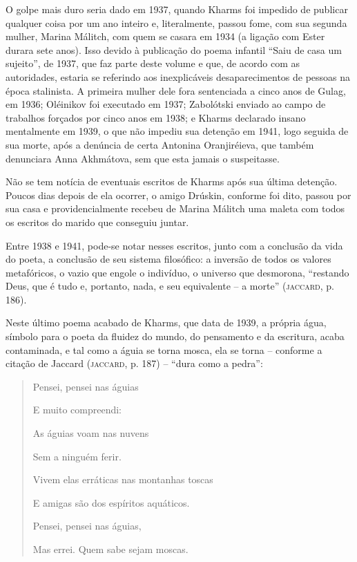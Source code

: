O golpe mais duro seria dado em 1937, quando Kharms foi impedido de
publicar qualquer coisa por um ano inteiro e, literalmente, passou fome,
com sua segunda mulher, Marina Málitch, com quem se casara em 1934 (a
ligação com Ester durara sete anos). Isso devido à publicação do poema
infantil ``Saiu de casa um sujeito'', de 1937, que faz parte deste
volume e que, de acordo com as autoridades, estaria se referindo aos
inexplicáveis desaparecimentos de pessoas na época stalinista. A
primeira mulher dele fora sentenciada a cinco anos de Gulag, em 1936;
Oléinikov foi executado em 1937; Zabolótski enviado ao campo de
trabalhos forçados por cinco anos em 1938; e Kharms declarado insano
mentalmente em 1939, o que não impediu sua detenção em 1941, logo
seguida de sua morte, após a denúncia de certa Antonina Oranjiréieva,
que também denunciara Anna Akhmátova, sem que esta jamais o suspeitasse.

Não se tem notícia de eventuais escritos de Kharms após sua última
detenção. Poucos dias depois de ela ocorrer, o amigo Drúskin, conforme
foi dito, passou por sua casa e providencialmente recebeu de Marina
Málitch uma maleta com todos os escritos do marido que conseguiu juntar.

Entre 1938 e 1941, pode-se notar nesses escritos, junto com a conclusão
da vida do poeta, a conclusão de seu sistema filosófico: a inversão de
todos os valores metafóricos, o vazio que engole o indivíduo, o universo
que desmorona, ``restando Deus, que é tudo e, portanto, nada, e seu
equivalente -- a morte'' (\textsc{jaccard}, p. 186).

Neste último poema acabado de Kharms, que data de 1939, a própria água,
símbolo para o poeta da fluidez do mundo, do pensamento e da escritura,
acaba contaminada, e tal como a águia se torna mosca, ela se torna --
conforme a citação de Jaccard (\textsc{jaccard}, p. 187) -- ``dura como
a pedra'':

\begin{quote}
Pensei, pensei nas águias

E muito compreendi:

As águias voam nas nuvens

Sem a ninguém ferir.

Vivem elas erráticas nas montanhas toscas

E amigas são dos espíritos aquáticos.

Pensei, pensei nas águias,

Mas errei. Quem sabe sejam moscas.
\end{quote}

